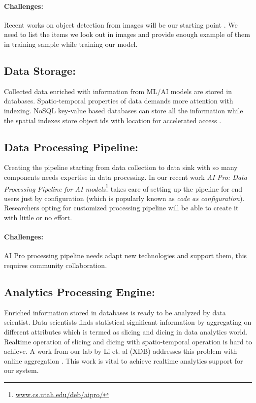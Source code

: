 \vspace{-2mm}
\paragraph{Challenges:}
Recent works on object detection from images will be our starting point \cite{girshick2014rich, mao2014deep}. We need to list the items we look out in images and provide enough example of them in training sample while training our model.


\subsection{Data Storage:}
Collected data enriched with information from ML/AI models are stored in databases. Spatio-temporal properties of data demands more attention with indexing. NoSQL key-value based databases can store all the information while the spatial indexes store object ids with location for accelerated access \cite{christensen2015storm}.

\subsection{Data Processing Pipeline:}
Creating the pipeline starting from data collection to data sink with so many components needs expertise in data processing. In our recent work {\em AI Pro: Data Processing Pipeline for AI models}\footnote{\href{http://www.cs.utah.edu/~deb/aipro/}{www.cs.utah.edu/deb/aipro/}} takes care of setting up the pipeline for end users just by configuration (which is popularly known as {\em code as configuration}).
Researchers opting for customized processing pipeline will be able to create it with little or no effort.

\vspace{-2mm}
\paragraph{Challenges:}
AI Pro processing pipeline needs adapt new technologies and support them, this requires community collaboration.

\subsection{Analytics Processing Engine:}
Enriched information stored in databases is ready to be analyzed by data scientist. Data scientists finds  statistical significant information by aggregating on different attributes which is termed as slicing and dicing in data analytics world. Realtime operation of slicing and dicing with spatio-temporal operation is hard to achieve. A work from our lab by Li et. al (XDB) addresses this problem with online aggregation \cite{li2017wander}. This work is vital to achieve realtime analytics support for our system.


